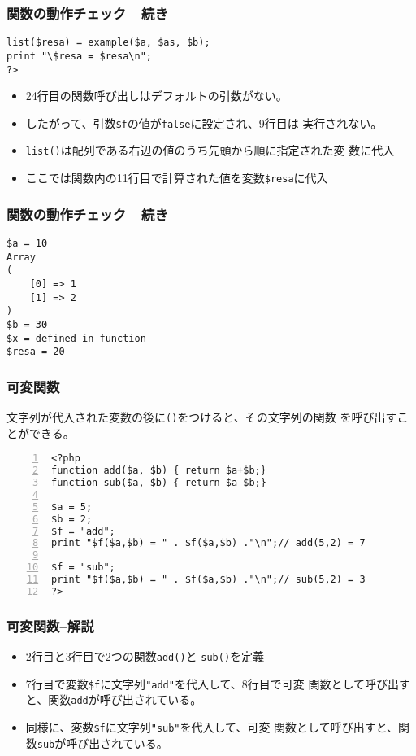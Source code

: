 \begin{frame}[containsverbatim]
\frametitle{関数の動作チェック---続き}
\begin{Verbatim}
list($resa) = example($a, $as, $b);
print "\$resa = $resa\n";
?>
\end{Verbatim}
\begin{itemize}
 \item 24行目の関数呼び出しはデフォルトの引数がない。
 \item したがって、引数\verb+$f+の値が\texttt{false}に設定され、9行目は
       実行されない。
 \item \texttt{list()}は配列である右辺の値のうち先頭から順に指定された変
       数に代入
 \item ここでは関数内の11行目で計算された値を変数\verb+$resa+に代入
\end{itemize}
\end{frame}
\begin{frame}[containsverbatim]
\frametitle{関数の動作チェック---続き}
\begin{Verbatim}
$a = 10
Array
(
    [0] => 1
    [1] => 2
)
$b = 30
$x = defined in function
$resa = 20
\end{Verbatim}
\end{frame}
 \begin{frame}[containsverbatim]
  \frametitle{可変関数}
 文字列が代入された変数の後に\texttt{()}をつけると、その文字列の関数
  を呼び出すことができる。
\begin{Verbatim}[fontsize=\small,numbers=left]
<?php
function add($a, $b) { return $a+$b;}
function sub($a, $b) { return $a-$b;}

$a = 5;
$b = 2;
$f = "add";
print "$f($a,$b) = " . $f($a,$b) ."\n";// add(5,2) = 7

$f = "sub";
print "$f($a,$b) = " . $f($a,$b) ."\n";// sub(5,2) = 3
?>
\end{Verbatim}
 \end{frame}
  \begin{frame}[containsverbatim]
  \frametitle{可変関数--解説}
\begin{itemize}
\item 2行目と3行目で2つの関数\texttt{add()}と
       \texttt{sub()}を定義
 \item 7行目で変数\Verb+$f+に文字列\Verb+"add"+を代入して、8行目で可変
       関数として呼び出すと、関数\texttt{add}が呼び出されている。
 \item 同様に、変数\Verb+$f+に文字列\Verb+"sub"+を代入して、可変
       関数として呼び出すと、関数\texttt{sub}が呼び出されている。
\end{itemize}
\end{frame}
